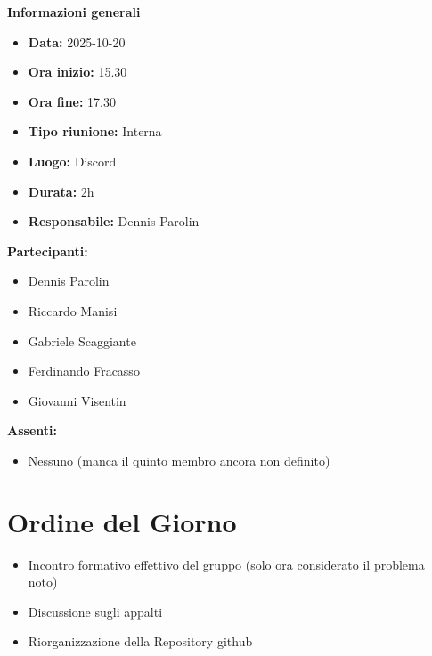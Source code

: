 \documentclass[a4paper,12pt]{article}
\begin{document}
\clearpage
{\large \textbf{Informazioni generali}}
{\footnotesize
{}

\begin{itemize}
    \item \textbf{Data:} 2025-10-20
    \item \textbf{Ora inizio:} 15.30
    \item \textbf{Ora fine:} 17.30
    \item \textbf{Tipo riunione:} Interna
    \item \textbf{Luogo:} Discord
    \item \textbf{Durata:} 2h
    \item \textbf{Responsabile:} Dennis Parolin
\end{itemize}

\vspace{0.2cm}

\textbf{Partecipanti:}
\begin{itemize}
    \item Dennis Parolin
    \item Riccardo Manisi
    \item Gabriele Scaggiante
    \item Ferdinando Fracasso
    \item Giovanni Visentin
\end{itemize}

\textbf{Assenti:}
\begin{itemize}
    \item Nessuno (manca il quinto membro ancora non definito)
\end{itemize}
}

\vspace{0.5cm}

\vspace{0.8cm}

\clearpage
\tableofcontents
\thispagestyle{empty} %
\clearpage

\section{Ordine del Giorno}
\begin{itemize}
    \item Incontro formativo effettivo del gruppo (solo ora considerato il problema noto)
    \item Discussione sugli appalti
    \item Riorganizzazione della Repository github
\end{itemize}
\end{document}

